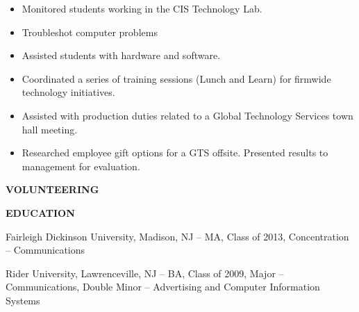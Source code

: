 \documentclass[letterpaper,12pt]{article}
\begin{document}
\pagebreak[4]
%
\begin{itemize}[nosep]
  \item
  Monitored students working in the CIS Technology Lab.
\item
  Troubleshot computer problems
\item
  Assisted students with hardware and software.
\end{itemize}
%
\begin{itemize}[nosep]
 \item
  Coordinated a series of training sessions (Lunch and Learn) for firmwide technology initiatives.
\item
  Assisted with production duties related to a Global Technology Services town hall meeting.
\item
  Researched employee gift options for a GTS offsite. Presented results to management for evaluation.
\end{itemize}
\begin{center}
\textbf{VOLUNTEERING}
\end{center}
%
%
\begin{center}
\textbf{EDUCATION}
\end{center}
\begin{raggedright}
Fairleigh Dickinson University, Madison, NJ – MA, Class of 2013, Concentration – Communications\\
\end{raggedright}
\vspace*{0.35cm}
\begin{raggedright}
Rider University, Lawrenceville, NJ – BA, Class of 2009, Major – Communications, Double Minor – Advertising and Computer Information Systems
\end{raggedright}
\end{document}
